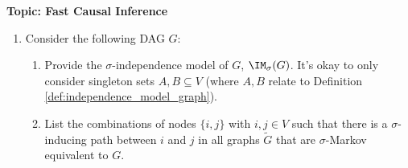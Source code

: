
\flushleft\textbf{Topic: Fast Causal Inference}

\begin{enumerate}
\item Consider the following DAG $G$:
\begin{center}
\end{center}

\begin{enumerate}
	\item %
	Provide the $\sigma$-independence model of $G$, $\IM_\sigma(G)$. It's okay to only consider singleton sets $A, B\subseteq V$ (where $A,B$ relate to Definition \ref*{def:independence_model_graph}).
	
	\item %
	List the combinations of nodes $\{i,j\}$ with $i,j\in V$ such that there is a $\sigma$-inducing path between $i$ and $j$ in all graphs $\tilde{G}$ that are $\sigma$-Markov equivalent to $G$.
	

\end{enumerate}
\end{enumerate}
